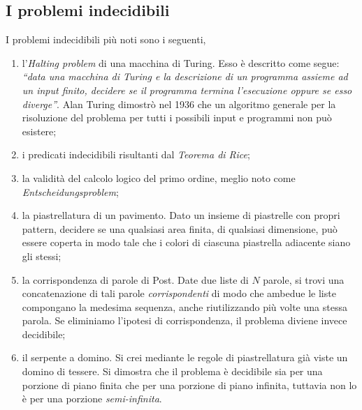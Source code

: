 \documentclass[10pt]{\classname}
\theoremstyle{newlinethm}
\theoremstyle{theorem}
\theoremstyle{definition}
\theoremstyle{definition}
\theoremstyle{definition}
\theoremstyle{definition}
\begin{document}
\subsection{I problemi indecidibili}
I problemi indecidibili più noti sono i seguenti,
\begin{enumerate}
    \item l'\emph{Halting problem} di una macchina di Turing. Esso è descritto come segue: \emph{``data una macchina di Turing e la descrizione di un programma assieme ad un input finito, decidere se il programma termina l'esecuzione oppure se esso diverge''}. Alan Turing dimostrò nel 1936 che un algoritmo generale per la risoluzione del problema per tutti i possibili input e programmi non può esistere;
    \item i predicati indecidibili risultanti dal \emph{Teorema di Rice};
    \item la validità del calcolo logico del primo ordine, meglio noto come \emph{Ent\-schei\-dungs\-pro\-blem};
    \item la piastrellatura di un pavimento. Dato un insieme di piastrelle con propri pattern, decidere se una qualsiasi area finita, di qualsiasi dimensione, può essere coperta in modo tale che i colori di ciascuna piastrella adiacente siano gli stessi;
    \item la corrispondenza di parole di Post. Date due liste di $N$ parole, si trovi una concatenazione di tali parole \emph{corrispondenti} di modo che ambedue le liste compongano la medesima sequenza, anche riutilizzando più volte una stessa parola. Se eliminiamo l'ipotesi di corrispondenza, il problema diviene invece decidibile;
    \item il serpente a domino. Si crei mediante le regole di piastrellatura già viste un domino di tessere. Si dimostra che il problema è decidibile sia per una porzione di piano finita che per una porzione di piano infinita, tuttavia non lo è per una porzione \emph{semi-infinita}.
\end{enumerate}
\end{document}
